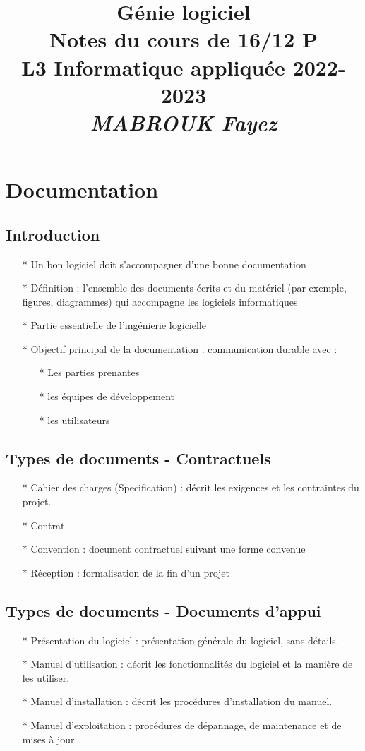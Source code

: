 \documentclass[12pt]{article}
\title{{\bf  Génie logiciel} \\
	Notes du cours de 16/12 P \no 2  \\
	{\small L3 Informatique appliquée 2022-2023} \\
	{\it \small MABROUK Fayez}}
\begin{document}
	\maketitle
	\newpage
	\section{Documentation}
	\subsection{Introduction}
	\begin{itemize}
		\item[* ] Un bon logiciel doit s'accompagner d'une bonne documentation
		\item[* ] Définition : l'ensemble des documents écrits et du matériel (par exemple, figures, diagrammes)
		qui accompagne les logiciels informatiques
		\item[* ] Partie essentielle de l'ingénierie logicielle
		\item[* ] Objectif principal de la documentation : communication durable avec :\\
		\begin{itemize}
			\item[* ] Les parties prenantes
			\item[* ] les équipes de développement
			\item[* ] les utilisateurs
		\end{itemize}
	\end{itemize}
\subsection{Types de documents - Contractuels}
\begin{itemize}
	\item[* ] Cahier des charges (Specification) : décrit les exigences et les contraintes du projet.
	\item[* ] Contrat
	\item[* ] Convention : document contractuel suivant une forme convenue
	\item[* ] Réception : formalisation de la fin d'un projet
\end{itemize}
\subsection{Types de documents - Documents d'appui}
\begin{itemize}
	\item[* ] Présentation du logiciel : présentation générale du logiciel, sans
	détails.
	\item[* ] Manuel d'utilisation : décrit les fonctionnalités du logiciel et la manière de les utiliser.
	\item[* ] Manuel d'installation : décrit les procédures d'installation du manuel.
	\item[* ] Manuel d'exploitation : procédures de dépannage, de maintenance et de mises à jour
\end{itemize}
\end{document}
